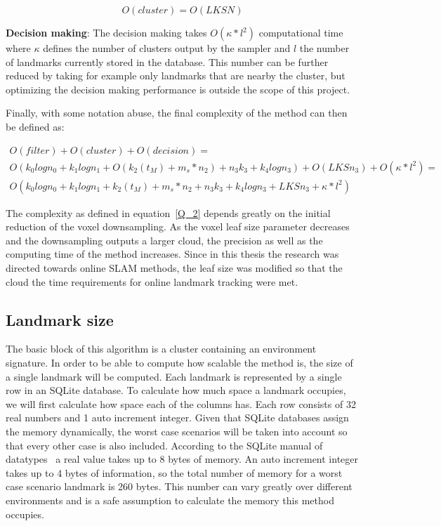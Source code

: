 \documentclass[twoside,hidelinks]{article}
\begin{document}
$$
O(cluster) = O(LKSN)
$$

\textbf{Decision making}: The decision making takes $ O(\kappa * l^2) $ computational time where $\kappa$ defines the number of clusters output by the sampler and $l$ the number of landmarks currently stored in the database. This number can be further reduced by taking for example only landmarks that are nearby the cluster, but optimizing the decision making performance is outside the scope of this project.


Finally, with some notation abuse, the final complexity of the method can then be defined as:

\begin{equation} \label{Q_2}
\begin{split}
O(filter) + O(cluster) + O(decision) = \\
O(k_{0}logn_{0} + k_{1}logn_{1} + O(k_{2}(t_M)+ m_s*n_{2}) + n_{3}k_{3} + k_{4}logn_{3} ) + O(LKSn_3) + O(\kappa * l^2)=\\
O(k_{0}logn_{0} + k_{1}logn_{1} + k_{2}(t_M)+ m_s*n_{2} + n_{3}k_{3} + k_{4}logn_{3} + LKSn_3 + \kappa * l^2)
\end{split}
\end{equation}

The complexity as defined in equation~\ref{Q_2} depends greatly on the initial reduction of the voxel downsampling. As the voxel leaf size parameter decreases and the downsampling outputs a larger cloud, the precision as well as the computing time of the method increases. Since in this thesis the research was directed towards online SLAM methods, the leaf size was modified so that the cloud the time requirements for online landmark tracking were met.

\subsection{Landmark size}

The basic block of this algorithm is a cluster containing an environment signature. In order to be able to compute how scalable the method is, the size of a single landmark will be computed. Each landmark is represented by a single row in an SQLite database. To calculate how much space a landmark occupies, we will first calculate how space each of the columns has. Each row consists of 32 real numbers and 1 auto increment integer. Given that SQLite databases assign the memory dynamically, the worst case scenarios will be taken into account so that every other case is also included. According to the SQLite manual of datatypes~\cite{sqlite} a real value takes up to 8 bytes of memory. An auto increment integer takes up to 4 bytes of information, so the total number  of memory for a worst case scenario landmark is 260 bytes. This number can vary greatly over different environments and is a safe assumption to calculate the memory this method occupies.
\end{document}
